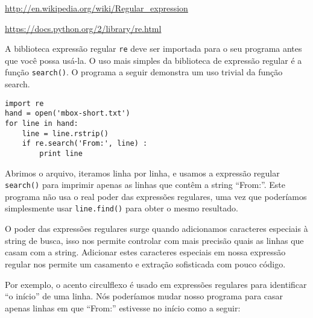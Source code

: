 \url{http://en.wikipedia.org/wiki/Regular_expression}

\url{https://docs.python.org/2/library/re.html}

A biblioteca expressão regular {\tt re} deve ser importada para o seu programa antes que você 
possa usá-la. O uso mais simples da biblioteca de expressão regular é a função {\tt search()}. 
O programa a seguir demonstra um uso trivial da função search.


\beforeverb
\begin{verbatim}
import re
hand = open('mbox-short.txt')
for line in hand:
    line = line.rstrip()
    if re.search('From:', line) :
        print line
\end{verbatim}
\afterverb
%

Abrimos o arquivo, iteramos linha por linha, e usamos a expressão regular {\tt search()} para
imprimir apenas as linhas que contêm a string ``From:''. Este programa não usa o real poder 
das expressões regulares, uma vez que poderíamos simplesmente usar {\tt line.find()} para
obter o mesmo resultado.



O poder das expressões regulares surge quando adicionamos caracteres especiais à string de busca, 
isso nos permite controlar com mais precisão quais as linhas que casam com a string. 
Adicionar estes caracteres especiais em nossa expressão regular nos permite um casamento e 
extração sofisticada com pouco código.

Por exemplo, o acento circulflexo é usado em expressões 
regulares para identificar ``o início'' de uma linha.
Nós poderíamos mudar nosso programa para casar apenas
linhas em que ``From:'' estivesse no início como a seguir:

